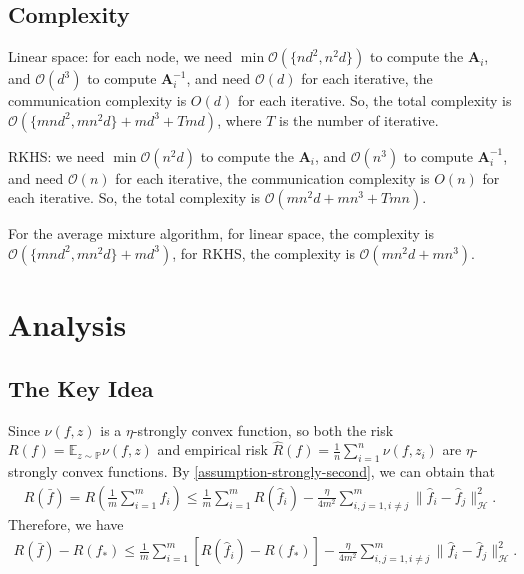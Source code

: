 \documentclass{article}
\begin{document}
\subsection{Complexity}
Linear space:  for each node, we need $\min \mathcal{O}\left(\{nd^2,n^2d\}\right)$ to compute the $\mathbf A_i$, and $\mathcal{O}(d^3)$ 
to compute $\mathbf A_i^{-1}$,  and need $\mathcal{O}(d)$ for each iterative,
the communication complexity is $O(d)$ for each iterative.
So, the total complexity is $\mathcal{O}\left(\{mnd^2,mn^2d\}+md^3+Tmd\right)$, where $T$ is the number of iterative.

RKHS: we need $\min \mathcal{O}\left(n^2d\right)$ to compute the $\mathbf A_i$, and $\mathcal{O}(n^3)$
to compute $\mathbf A_i^{-1}$,  and need $\mathcal{O}(n)$ for each iterative,
the communication complexity is $O(n)$ for each iterative.
So, the total complexity is $\mathcal{O}\left(mn^2d+mn^3+Tmn\right)$.  

For the average mixture algorithm, for linear space, the complexity is $\mathcal{O}\left(\{mnd^2,mn^2d\}+md^3\right)$,
for RKHS, the complexity is $\mathcal{O}\left(mn^2d+mn^3\right)$.
\section{Analysis}
\subsection{The Key Idea}
Since $\nu(f,z)$ is a $\eta$-strongly convex function,
so both the risk $R(f)=\mathbb{E}_{z\sim\mathbb{P}}\nu(f,z)$ and empirical risk $\hat{R}(f)=\frac{1}{n}\sum_{i=1}^n\nu(f,z_i)$
are $\eta$-strongly convex functions.
By \eqref{assumption-strongly-second}, we can obtain that
\begin{align*}
  R(\bar{f})=R\left(\frac{1}{m}\sum_{i=1}^m\hat{f}_i\right)\leq
  \frac{1}{m}\sum_{i=1}^mR(\hat{f}_i)-\frac{\eta}{4m^2}\sum_{i,j=1, i\not=j}^m\|\hat{f}_i-\hat{f}_j\|_\mathcal{H}^2.
\end{align*}
Therefore, we have
\begin{align}
\label{equaiton-strongly-ff}
  R(\bar{f})-R(f_\ast)\leq \frac{1}{m}\sum_{i=1}^m\left[R(\hat{f}_i)-R(f_\ast)\right]
  -\frac{\eta}{4m^2}\sum_{i,j=1,i\not=j}^m\|\hat{f}_i-\hat{f}_j\|_\mathcal{H}^2.
\end{align}
\end{document}

